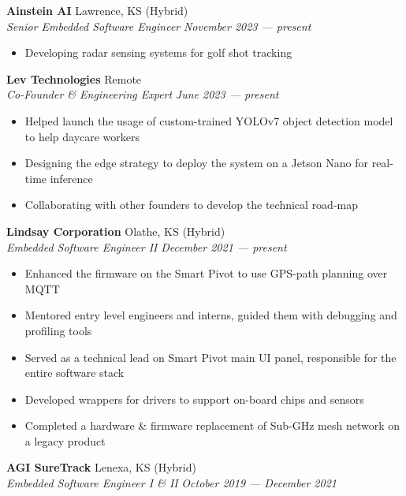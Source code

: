 \documentclass[a4paper]{article}
\begin{document}
\textbf{Ainstein AI} \hfill Lawrence, KS (Hybrid)\\
\textit{Senior Embedded Software Engineer} \hfill \textit{November 2023 --- present}\\
\vspace{-1mm}
\begin{itemize}
    \item Developing radar sensing systems for golf shot tracking
\end{itemize}
\textbf{Lev Technologies} \hfill Remote\\
\textit{Co-Founder \& Engineering Expert} \hfill \textit{June 2023 --- present}\\
\vspace{-1mm}
\begin{itemize} \itemsep 1pt
    \item Helped launch the usage of custom-trained YOLOv7 object detection model to help daycare workers
    \item Designing the edge strategy to deploy the system on a Jetson Nano for real-time inference
    \item Collaborating with other founders to develop the technical road-map
\end{itemize}
\textbf{Lindsay Corporation} \hfill Olathe, KS (Hybrid)\\
\textit{Embedded Software Engineer II} \hfill \textit{December 2021 --- present}\\
\vspace{-1mm}
\begin{itemize} \itemsep 1pt
    \item Enhanced the firmware on the Smart Pivot to use GPS-path planning over MQTT
    \item Mentored entry level engineers and interns, guided them with debugging and profiling tools
    \item Served as a technical lead on Smart Pivot main UI panel, responsible for the entire software stack
    \item Developed wrappers for drivers to support on-board chips and sensors
    \item Completed a hardware \& firmware replacement of Sub-GHz mesh network on a legacy product
\end{itemize}
\textbf{AGI SureTrack} \hfill Lenexa, KS (Hybrid)\\
\textit{Embedded Software Engineer I \& II} \hfill \textit{October 2019 --- December 2021}\\
\vspace{-1mm}
\end{document}
